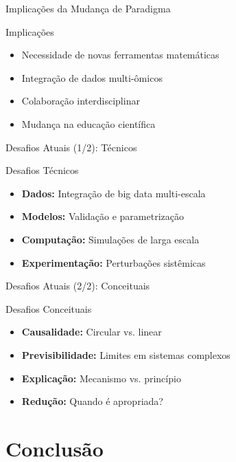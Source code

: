 \begin{frame}{Implicações da Mudança de Paradigma}
\begin{block}{Implicações}
\begin{itemize}
    \item Necessidade de novas ferramentas matemáticas
    \item Integração de dados multi-ômicos
    \item Colaboração interdisciplinar
    \item Mudança na educação científica
\end{itemize}
\end{block}
\end{frame}

\begin{frame}{Desafios Atuais (1/2): Técnicos}
\begin{block}{Desafios Técnicos}
\begin{itemize}
    \item \textbf{Dados:} Integração de big data multi-escala
    \item \textbf{Modelos:} Validação e parametrização
    \item \textbf{Computação:} Simulações de larga escala
    \item \textbf{Experimentação:} Perturbações sistêmicas
\end{itemize}
\end{block}
\end{frame}

\begin{frame}{Desafios Atuais (2/2): Conceituais}
\begin{block}{Desafios Conceituais}
\begin{itemize}
    \item \textbf{Causalidade:} Circular vs. linear
    \item \textbf{Previsibilidade:} Limites em sistemas complexos
    \item \textbf{Explicação:} Mecanismo vs. princípio
    \item \textbf{Redução:} Quando é apropriada?
\end{itemize}
\end{block}
\end{frame}

\section{Conclusão}

